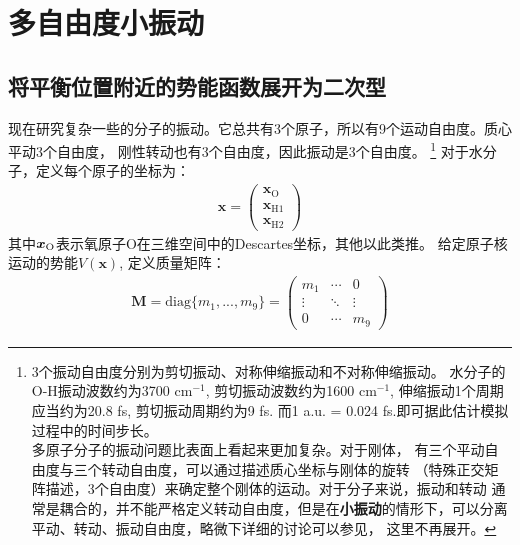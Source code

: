 \chapter{多自由度小振动}
    \section{将平衡位置附近的势能函数展开为二次型}
    现在研究复杂一些的分子的振动。它总共有3个原子，所以有9个运动自由度。质心平动3个自由度，
    刚性转动也有3个自由度，因此振动是3个自由度。
    \footnote{
    3个振动自由度分别为剪切振动、对称伸缩振动和不对称伸缩振动。
    水分子的O-H振动波数约为3700 cm$^{-1}$, 剪切振动波数约为1600 cm$^{-1}$, 
    伸缩振动1个周期应当约为20.8 fs, 剪切振动周期约为9 fs. 而1 a.u. = 0.024 fs.即可据此估计模拟过程中的时间步长。\\
    多原子分子的振动问题比表面上看起来更加复杂。对于刚体，
    有三个平动自由度与三个转动自由度，可以通过描述质心坐标与刚体的旋转
    （特殊正交矩阵描述，3个自由度）来确定整个刚体的运动。对于分子来说，振动和转动
    通常是耦合的，并不能严格定义转动自由度，但是在\textbf{小振动}的情形下，可以分离
    平动、转动、振动自由度，略微下详细的讨论可以参见\cite{Landau2007mechanics}，
    这里不再展开。
    }
    对于水分子，定义每个原子的坐标为：
    \begin{equation}
        \begin{split}
        \bm{x} = 
        \begin{pmatrix}
            \bm{x}_\mathrm{O}\\
            \bm{x}_{\mathrm{H1}}\\
            \bm{x}_{\mathrm{H2}}
        \end{pmatrix}
    \end{split}
    \end{equation}
    其中$\bm{x}_{\mathrm{O}}$表示氧原子O在三维空间中的Descartes坐标，其他以此类推。
    给定原子核运动的势能$V(\bm{x})$, 定义质量矩阵：
    \begin{equation}
        \begin{split}
        \bm{M} = \mathrm{diag} \{m_1,...,m_9 \} = 
        \begin{pmatrix}
            m_1 & \cdots & 0\\
            \vdots & \ddots & \vdots\\
            0 & \cdots & m_9
        \end{pmatrix}
        \label{mass matrix}
    \end{split}
    \end{equation}

